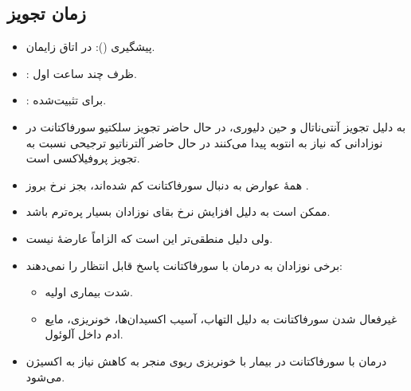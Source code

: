 \documentclass[12pt,a4paper]{article}
\begin{document}
\subsection*{زمان تجویز}
\begin{itemize}
\item پیشگیری (): در اتاق زایمان.
\item {}: ظرف چند ساعت اول.
\item {}: برای  تثبیت‌شده.
\end{itemize}
\begin{itemize}
\item به دلیل تجویز آنتی‌ناتال  و  حین دلیوری، در حال حاضر تجویز سلکتیو سورفاکتانت در نوزادانی که نیاز به انتوبه پیدا می‌کنند در حال حاضر آلترناتیو ترجیحی نسبت به تجویز پروفیلاکسی است.
\item همهٔ عوارض  به دنبال سورفاکتانت کم شده‌اند، بجز نرخ بروز .
\item ممکن است به دلیل افزایش نرخ بقای نوزادان بسیار پره‌ترم باشد.
\item ولی دلیل منطقی‌تر این است که  الزاماً عارضهٔ  نیست.
\item برخی نوزادان  به درمان با سورفاکتانت پاسخ قابل انتظار را نمی‌دهند:
\begin{itemize}
\item شدت بیماری اولیه.
\item غیرفعال شدن سورفاکتانت به دلیل التهاب، آسیب اکسیدان‌ها، خونریزی، مایع ادم داخل آلوئول.
\end{itemize}
\item درمان با سورفاکتانت در بیمار با خونریزی ریوی منجر به کاهش نیاز به اکسیژن می‌شود.
\end{itemize}

\end{document}
